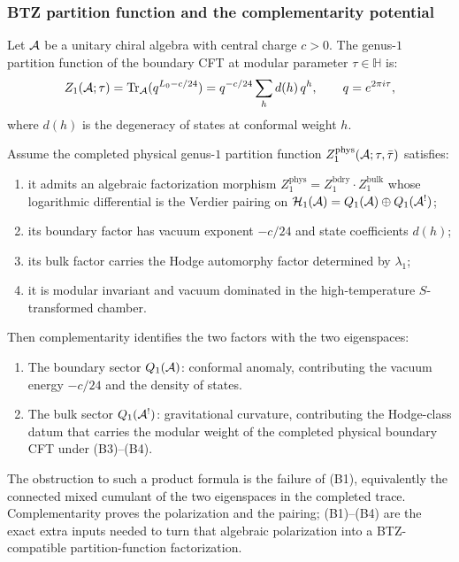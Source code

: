 \subsubsection{BTZ partition function and the complementarity
potential}

\begin{theorem}
Let $\mathcal{A}$ be a unitary chiral algebra with central charge
$c > 0$. The genus-$1$ partition function of the boundary
CFT at modular parameter $\tau \in \mathbb{H}$ is:
\begin{equation}%
Z_1(\cA; \tau)
= \Tr_{\cA}(q^{L_0 - c/24})
= q^{-c/24} \sum_h d(h)\, q^h,
\qquad q = e^{2\pi i \tau},
\end{equation}
where $d(h)$ is the degeneracy of states at conformal
weight $h$.

Assume the completed physical genus-$1$ partition function
\(Z_1^{\mathrm{phys}}(\mathcal{A};\tau,\bar\tau)\) satisfies:
\begin{enumerate}[label=\textup{(B\arabic*)}]
\item it admits an algebraic factorization morphism
 \(Z_1^{\mathrm{phys}}=
  Z_1^{\mathrm{bdry}}\cdot Z_1^{\mathrm{bulk}}\)
 whose logarithmic differential is the Verdier pairing on
 \(\mathcal H_1(\mathcal{A})=Q_1(\mathcal{A})\oplus Q_1(\mathcal{A}^!)\);
\item its boundary factor has vacuum exponent \(-c/24\) and state
 coefficients \(d(h)\);
\item its bulk factor carries the Hodge automorphy factor determined
 by \(\lambda_1\);
\item it is modular invariant and vacuum dominated in the
 high-temperature \(S\)-transformed chamber.
\end{enumerate}
Then complementarity identifies the two factors with the two
eigenspaces:
\begin{enumerate}[label=\textup{(\alph*)}]
\item The boundary sector
 $Q_1(\mathcal{A})$: conformal anomaly, contributing the
 vacuum energy $-c/24$ and the density of states.
\item The bulk sector
 $Q_1(\mathcal{A}^!)$: gravitational curvature, contributing the
 Hodge-class datum that carries the modular weight of the completed
 physical boundary CFT under \textup{(B3)--(B4)}.
\end{enumerate}
The obstruction to such a product formula is the failure of
\textup{(B1)}, equivalently the connected mixed cumulant of the two
eigenspaces in the completed trace. Complementarity proves the
polarization and the pairing; \textup{(B1)--(B4)} are the exact extra
inputs needed to turn that algebraic polarization into a BTZ-compatible
partition-function factorization.
\end{theorem}

